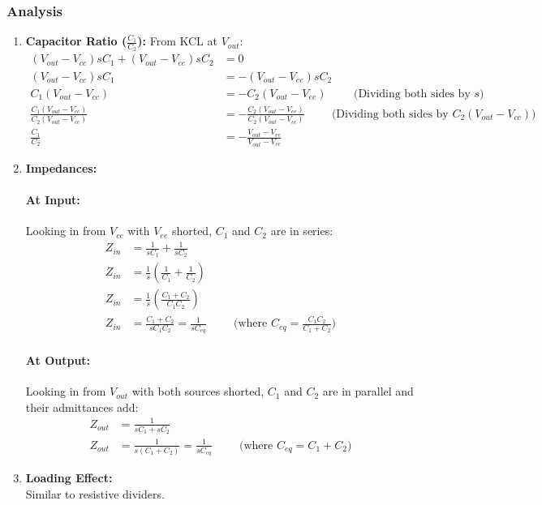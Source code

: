 \subsubsection{Analysis}
\begin{enumerate}
  \item \textbf{Capacitor Ratio (\(\frac{C_1}{C_2}\)):}
    From KCL at \(V_{out}\):
    \begin{align*}
      (V_{out} - V_{cc})sC_1 + (V_{out} - V_{ee})sC_2 &= 0 \\
      (V_{out} - V_{cc})sC_1 &= -(V_{out} - V_{ee})sC_2 \\
      C_1(V_{out} - V_{cc}) &= -C_2(V_{out} - V_{ee}) \hspace{1cm} \text{(Dividing both sides by \(s\))} \\
      \frac{C_1(V_{out} - V_{cc})}{C_2(V_{out} - V_{cc})} &= -\frac{C_2(V_{out} - V_{ee})}{C_2(V_{out} - V_{cc})} \hspace{1cm} \text{(Dividing both sides by \(C_2(V_{out} - V_{cc})\))} \\
      \frac{C_1}{C_2} &= -\frac{V_{out} - V_{ee}}{V_{out} - V_{cc}}
    \end{align*}
  \item \textbf{Impedances:}
    \paragraph{At Input:} Looking in from \(V_{cc}\) with \(V_{ee}\) shorted,
    \(C_1\) and \(C_2\) are in series:
      \begin{align*}
        Z_{in} &= \frac{1}{sC_1} + \frac{1}{sC_2} \\
        Z_{in} &= \frac{1}{s}\left(\frac{1}{C_1} + \frac{1}{C_2}\right) \\
        Z_{in} &= \frac{1}{s}\left(\frac{C_1 + C_2}{C_1 C_2}\right) \\
        Z_{in} &= \frac{C_1 + C_2}{s C_1 C_2} = \frac{1}{sC_{eq}} \hspace{1cm} \text{(where \(C_{eq} = \frac{C_1 C_2}{C_1 + C_2}\))}
      \end{align*}
    \paragraph{At Output:} Looking in from \(V_{out}\) with both sources
    shorted, \(C_1\) and \(C_2\) are in parallel and their admittances add:
      \begin{align*}
        Z_{out} &= \frac{1}{sC_1 + sC_2} \\
        Z_{out} &= \frac{1}{s(C_1 + C_2)} = \frac{1}{sC_{eq}} \hspace{1cm} \text{(where \(C_{eq} = C_1 + C_2\))}
      \end{align*}
  \item \textbf{Loading Effect:} \\
    Similar to resistive dividers.
\end{enumerate}

